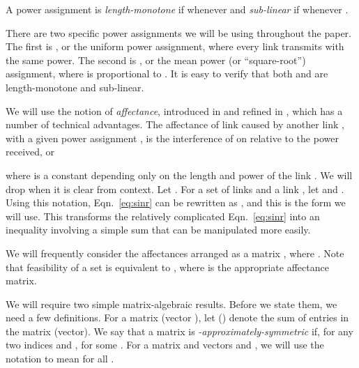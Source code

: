 \documentclass[11pt]{amsart}
\begin{document}
A power assignment  is \emph{length-monotone} if  whenever
 and \emph{sub-linear} if  whenever .

There are two specific power assignments we will be using throughout the
paper.  The first is , 
or the uniform power assignment, where
every link transmits with the same power. The second is ,
or
the mean power (or ``square-root'') assignment, where  is proportional to
. It is easy to verify that both  and 
are length-monotone and sub-linear.


\iffalse
\paragraph{Assumption}
We shall assume that the impact of noise is limited.
Namely, that , for any link .
This excludes very weak links with lengths in a small range.
More precisely, let  be the longest length of a link that
can be transmitted without any interference, or . We therefore assume that , for any link . 
We can strengthen this to a , for any fixed .
\fi

We will use the notion of \emph{affectance}, introduced in
\cite{GHWW09} and refined in \cite{HW09}, which has a number of
technical advantages.  
The affectance  of link  caused by another link ,
with a given power assignment ,
is the interference of  on  relative to the power
received, or
   
where  is a constant
depending only on the length and power of the link . We will
drop  when it is clear from context. 
Let .
For a set  of links and a link , 
let  and .
Using this notation, Eqn.~\ref{eq:sinr} can be rewritten as , and this is the form we will use. This transforms the
relatively complicated Eqn.~\ref{eq:sinr} into an inequality involving
a simple sum that can be manipulated more easily.



\iffalse
Or, for power assignment 
 
where  is a constant depending only on the length and power of the link . We will simply use  when the power assignment is clear from the context.
\fi







We will frequently consider the affectances arranged as a matrix
, where . 
Note that feasibility of a set  is equivalent to , where  
is the appropriate affectance matrix. 

We will require two simple matrix-algebraic results. Before we state
them, we need a few definitions. For a matrix  (vector
), let  () denote
the sum of entries in the matrix (vector).  We say that a matrix
 is \emph{-approximately-symmetric} if, for
any two indices  and ,  for some . For a matrix  and vectors  and
, we will use the notation  to mean 
for all .
\end{document}

